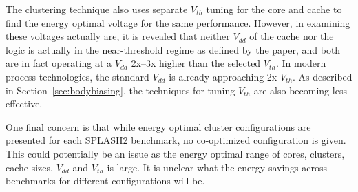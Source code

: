 The clustering technique also uses separate $V_{th}$ tuning for the core and
cache to find the energy optimal voltage for the same performance. However, in
examining these voltages actually are, it is revealed that neither $V_{dd}$
of the cache nor the logic is actually in the near-threshold regime as defined
by the paper, and both are in fact operating at a $V_{dd}$ 2x--3x higher than
the selected $V_{th}$. In modern process technologies, the standard $V_{dd}$ is
already approaching 2x $V_{th}$. As described in Section~\ref{sec:bodybiasing},
the techniques for tuning $V_{th}$ are also becoming less effective.

One final concern is that while energy optimal cluster configurations are
presented for each SPLASH2 benchmark, no co-optimized configuration is given.
This could potentially be an issue as the energy optimal range of cores,
clusters, cache sizes, $V_{dd}$ and $V_{th}$ is large. It is unclear what the
energy savings across benchmarks for different configurations will be.
